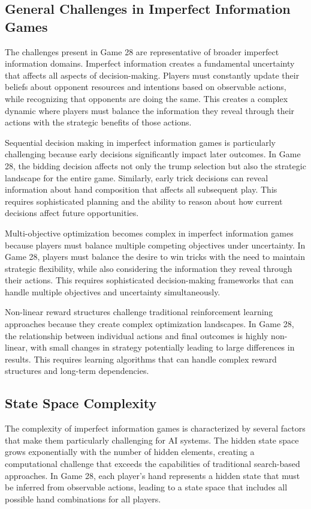 \documentclass[conference]{IEEEtran}
\begin{document}
\subsection{General Challenges in Imperfect Information Games}

The challenges present in Game 28 are representative of broader imperfect information domains. Imperfect information creates a fundamental uncertainty that affects all aspects of decision-making. Players must constantly update their beliefs about opponent resources and intentions based on observable actions, while recognizing that opponents are doing the same. This creates a complex dynamic where players must balance the information they reveal through their actions with the strategic benefits of those actions.

Sequential decision making in imperfect information games is particularly challenging because early decisions significantly impact later outcomes. In Game 28, the bidding decision affects not only the trump selection but also the strategic landscape for the entire game. Similarly, early trick decisions can reveal information about hand composition that affects all subsequent play. This requires sophisticated planning and the ability to reason about how current decisions affect future opportunities.

Multi-objective optimization becomes complex in imperfect information games because players must balance multiple competing objectives under uncertainty. In Game 28, players must balance the desire to win tricks with the need to maintain strategic flexibility, while also considering the information they reveal through their actions. This requires sophisticated decision-making frameworks that can handle multiple objectives and uncertainty simultaneously.

Non-linear reward structures challenge traditional reinforcement learning approaches because they create complex optimization landscapes. In Game 28, the relationship between individual actions and final outcomes is highly non-linear, with small changes in strategy potentially leading to large differences in results. This requires learning algorithms that can handle complex reward structures and long-term dependencies.

\subsection{State Space Complexity}

The complexity of imperfect information games is characterized by several factors that make them particularly challenging for AI systems. The hidden state space grows exponentially with the number of hidden elements, creating a computational challenge that exceeds the capabilities of traditional search-based approaches. In Game 28, each player's hand represents a hidden state that must be inferred from observable actions, leading to a state space that includes all possible hand combinations for all players.
\end{document}
